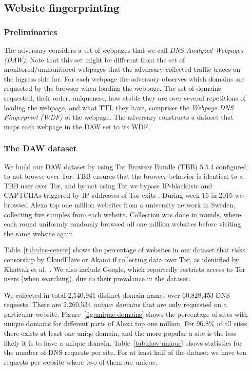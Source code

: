 \subsection{Website fingerprinting}

\subsubsection{Preliminaries}
The adversary considers a set of webpages that we call \emph{DNS
Analyzed Webpages (DAW)}. Note that this set might be different from the
set of monitored/unmonitored webpages that the adversary collected
traffic traces on the ingress side for.
For each webpage the adversary observes which domains are requested by
the browser when loading the webpage. The set of domains requested,
their order, uniqueness, how stable they are over several repetitions of
loading the webpage, and what TTL they have, comprises the
\emph{Webpage DNS Fingerprint (WDF)} of the webpage.
The adversary constructs a dataset that maps each webpage in the DAW set
to its WDF.

\subsubsection{The DAW dataset}
We build our DAW dataset by using Tor Browser Bundle (TBB) 5.5.4
configured to not browse over Tor: TBB ensures that the browser behavior is
identical to a TBB user over Tor, and by not using Tor we bypass IP-blacklists
and CAPTCHAs triggered by IP-addresses of Tor-exits \cite{Khattak2016a}.
During week 16 in 2016 we browsed Alexa top one million websites from a
university network in Sweden, collecting five samples from each website.
Collection was done in rounds, where each round uniformly randomly browsed all one
million websites before visiting the same website again.

Table~\ref{tab:dns-censor} shows the percentage of websites in our dataset that
risks censorship by CloudFlare or Akami if collecting data over Tor, as
identified by Khattak et al.~\cite{Khattak2016a}. We also include Google, which
reportedly restricts access to Tor users (when searching), due to
their prevalance in the dataset.

We collected in total 2,540,941 distinct domain names over 60,828,453 DNS requests.
There are 2,260,534 \emph {unique domains} that are only requested on a
particular website. Figure~\ref{fig:unique-domains} shows the percentage of sites
with unique domains for different parts of Alexa top one million.
For 96.8\% of all sites there exists at least one uniqe domain, and the more popular
a site is the less likely it is to have a unique domain.
Table~\ref{tab:daw-unique} shows statistics for the number of DNS requests per site.
For at least half of the dataset we have ten requests per website where two of them
are unique.

